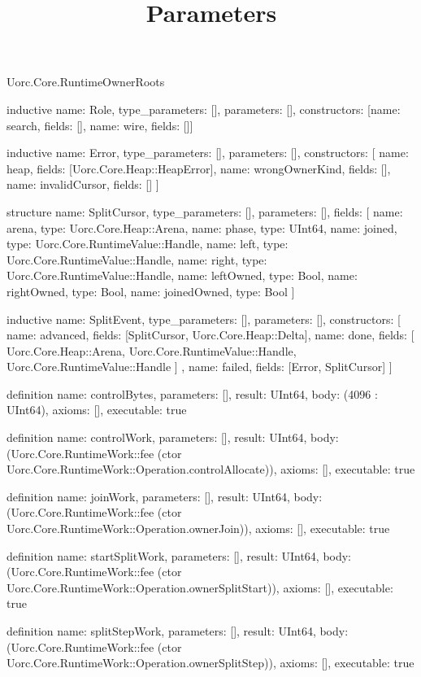 \begin{lexlean}{Uorc.Core.RuntimeOwnerRoots}
\title{Parameters}
\begin{semanticmodule}
inductive{
  name: Role,
  type_parameters: [],
  parameters: [],
  constructors: [{name: search, fields: []}, {name: wire, fields: []}]
}

inductive{
  name: Error,
  type_parameters: [],
  parameters: [],
  constructors: [
    {name: heap, fields: [Uorc.Core.Heap::HeapError]},
    {name: wrongOwnerKind, fields: []},
    {name: invalidCursor, fields: []}
  ]
}

structure{
  name: SplitCursor,
  type_parameters: [],
  parameters: [],
  fields: [
    {name: arena, type: Uorc.Core.Heap::Arena},
    {name: phase, type: UInt64},
    {name: joined, type: Uorc.Core.RuntimeValue::Handle},
    {name: left, type: Uorc.Core.RuntimeValue::Handle},
    {name: right, type: Uorc.Core.RuntimeValue::Handle},
    {name: leftOwned, type: Bool},
    {name: rightOwned, type: Bool},
    {name: joinedOwned, type: Bool}
  ]
}

inductive{
  name: SplitEvent,
  type_parameters: [],
  parameters: [],
  constructors: [
    {name: advanced, fields: [SplitCursor, Uorc.Core.Heap::Delta]},
    {
      name: done,
      fields: [
        Uorc.Core.Heap::Arena,
        Uorc.Core.RuntimeValue::Handle,
        Uorc.Core.RuntimeValue::Handle
      ]
    },
    {name: failed, fields: [Error, SplitCursor]}
  ]
}

definition{
  name: controlBytes,
  parameters: [],
  result: UInt64,
  body: (4096 : UInt64),
  axioms: [],
  executable: true
}

definition{
  name: controlWork,
  parameters: [],
  result: UInt64,
  body: (Uorc.Core.RuntimeWork::fee (ctor Uorc.Core.RuntimeWork::Operation.controlAllocate)),
  axioms: [],
  executable: true
}

definition{
  name: joinWork,
  parameters: [],
  result: UInt64,
  body: (Uorc.Core.RuntimeWork::fee (ctor Uorc.Core.RuntimeWork::Operation.ownerJoin)),
  axioms: [],
  executable: true
}

definition{
  name: startSplitWork,
  parameters: [],
  result: UInt64,
  body: (Uorc.Core.RuntimeWork::fee (ctor Uorc.Core.RuntimeWork::Operation.ownerSplitStart)),
  axioms: [],
  executable: true
}

definition{
  name: splitStepWork,
  parameters: [],
  result: UInt64,
  body: (Uorc.Core.RuntimeWork::fee (ctor Uorc.Core.RuntimeWork::Operation.ownerSplitStep)),
  axioms: [],
  executable: true
}


\end{semanticmodule}
\end{lexlean}
